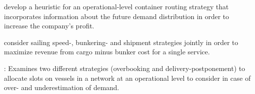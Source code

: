 \citet{Zhen17} develop a heuristic for an operational-level container routing strategy that incorporates information about the future demand distribution in order to increase the company's profit.

\citet{Wang19a} consider sailing speed-, bunkering- and shipment strategies jointly in order to maximize revenue from cargo minus bunker cost for a single service.

\citet{Wang19b}: Examines two different strategies (overbooking and delivery-postponement) to allocate slots on vessels in a network at an operational level to consider in case of over- and underestimation of demand.
